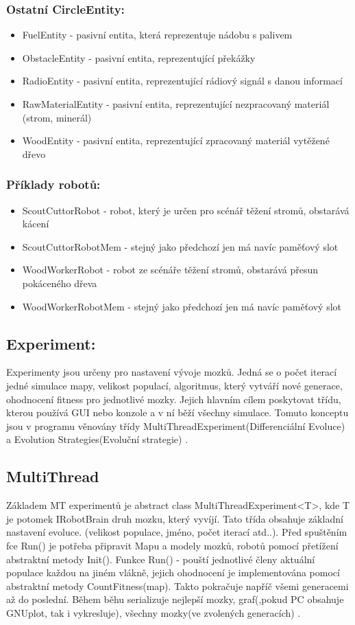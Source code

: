\subsubsection{Ostatní CircleEntity: }
\begin{itemize}
\item FuelEntity - pasivní entita, která reprezentuje nádobu s palivem
\item ObstacleEntity - pasivní entita, reprezentující překážky
\item  RadioEntity  - pasivní entita, reprezentující rádiový signál s danou informací 
\item  RawMaterialEntity - pasivní entita, reprezentující nezpracovaný materiál (strom, minerál) 
\item  WoodEntity - pasivní entita, reprezentující zpracovaný materiál vytěžené dřevo
\end{itemize}
\subsubsection{Příklady robotů:}
\begin{itemize}
\item ScoutCuttorRobot - robot, který je určen pro scénář těžení stromů, obstarává kácení
\item ScoutCuttorRobotMem -  stejný jako předchozí jen má navíc paměťový slot
\item WoodWorkerRobot - robot ze scénáře těžení stromů, obstarává přesun pokáceného dřeva 
\item WoodWorkerRobotMem - stejný jako předchozí jen má navíc paměťový slot
\end{itemize}
\newpage 
\subsection{Experiment:}
Experimenty jsou určeny pro nastavení vývoje mozků. Jedná se o počet iterací jedné simulace mapy, velikost populací, algoritmus, který vytváří nové generace, ohodnocení fitness pro jednotlivé mozky. Jejich hlavním cílem poskytovat třídu, kterou používá GUI nebo konzole a v ní běží všechny simulace. Tomuto konceptu jsou v programu věnovány třídy MultiThreadExperiment(Differenciální Evoluce) a Evolution Strategies(Evoluční strategie) . \par
\par
\subsection{MultiThread}
Základem MT experimentů je abstract class MultiThreadExperiment<T>, kde T je potomek IRobotBrain druh mozku, který vyvíjí. Tato třída obsahuje základní nastavení evoluce. (velikost populace, jméno, počet iterací atd..). Před spuštěním fce Run() je potřeba připravit Mapu a modely mozků, robotů pomocí přetížení abstraktní metody Init(). Funkce Run() - pouští jednotlivé členy aktuální populace každou na jiném vlákně, jejich ohodnocení je implementována pomocí abstraktní metody CountFitness(map). Takto pokračuje napříč všemi generacemi až do poslední. Během běhu serializuje nejlepší mozky, graf(,pokud PC obsahuje GNUplot, tak i vykresluje), všechny mozky(ve zvolených generacích) . \\
